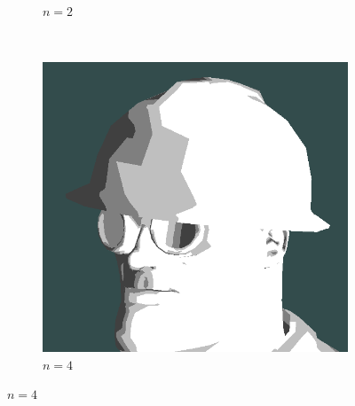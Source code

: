 \begin{figure}[h]
\begin{subfigure}[b]{0.15\textwidth}
        \caption{$n = 2$}
        \label{fig:cel-shading-n2}
    \end{subfigure}
    ~
    \begin{subfigure}[b]{0.15\textwidth}
        \includegraphics[width=\textwidth]{img/cel-shading-n4.png}
        \caption{$n = 4$}
        \label{fig:cel-shading-n4}
    \end{subfigure}


\end{figure}
